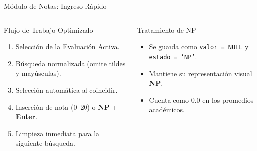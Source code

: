 \documentclass[aspectratio=169,10pt]{beamer}
\begin{document}
\begin{frame}{Módulo de Notas: Ingreso Rápido}
  \begin{columns}
      \begin{block}{Flujo de Trabajo Optimizado}
        \begin{enumerate}
          \item Selección de la Evaluación Activa.
          \item Búsqueda normalizada (omite tildes y mayúsculas).
          \item Selección automática al coincidir.
          \item Inserción de nota (0--20) o \textbf{NP} + \textbf{Enter}.
          \item Limpieza inmediata para la siguiente búsqueda.
        \end{enumerate}
      \end{block}
      \begin{exampleblock}{Tratamiento de NP}
        \begin{itemize}
          \item Se guarda como \texttt{valor = NULL} y \texttt{estado = 'NP'}.
          \item Mantiene su representación visual \textbf{NP}.
          \item Cuenta como $0.0$ en los promedios académicos.
        \end{itemize}
      \end{exampleblock}
  \end{columns}
\end{frame}
\end{document}
